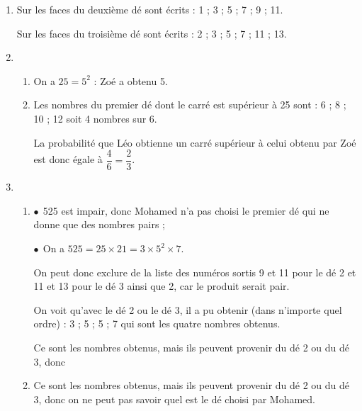 
\medskip

%
%
%
%
%

\begin{enumerate}
\item %
Sur les faces du deuxième dé sont écrits : 1 ; 3 ; 5 ; 7 ; 9 ; 11.

Sur les faces du troisième dé sont écrits : 2 ; 3 ; 5  ; 7 ; 11 ; 13.
\item %
	\begin{enumerate}
		\item %
On a $25 = 5^2$ : Zoé a obtenu 5.
		\item %
Les nombres du premier dé dont le carré est supérieur à 25 sont : 6 ; 8 ; 10 ; 12 soit 4 nombres sur 6.
		
La probabilité que Léo obtienne un carré supérieur à celui obtenu par Zoé est donc égale à $\dfrac{4}{6} = \dfrac{2}{3}$.
 	\end{enumerate}
\item  %
	\begin{enumerate}
		\item %
$\bullet~~$525 est impair, donc Mohamed n'a pas choisi le premier dé qui ne donne que des nombres pairs ;
		
$\bullet~~$On a $525 = 25 \times 21 = 3 \times 5^2 \times 7$.

On peut donc exclure de la liste des numéros sortis 9 et 11 pour le dé 2 et 11 et 13 pour le dé 3 ainsi que 2, car le produit serait pair.

On voit qu'avec le dé 2 ou le dé 3, il a pu obtenir (dans n'importe quel ordre) : 3 ; 5 ; 5 ; 7 qui sont les quatre nombres obtenus.

Ce sont les nombres obtenus, mais ils peuvent provenir du dé 2 ou du dé 3, donc
		\item %
Ce sont les nombres obtenus, mais ils peuvent provenir du dé 2 ou du dé 3, donc on ne peut pas savoir quel est le dé choisi par Mohamed.
 	\end{enumerate}
\end{enumerate}

\bigskip

